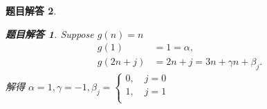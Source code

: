 \documentclass[mode=geye]{elegantnote}
\newtheorem{answer}{题目解答}
\begin{document}
\begin{answer}
\begin{answer}
	Suppose $ g(n) = n $
	\begin{equation*}
		\begin{aligned}
			g(1) 	&= 1 = \alpha,\\
			g(2n+j)	&= 2n+j = 3n+\gamma n+\beta_j.
		\end{aligned}
	\end{equation*}
解得 $   \alpha = 1, \gamma = -1, \beta_j = \left\{ \begin{array}{l}
	0,\quad j=0\\
	1,\quad j=1\\
\end{array}\right.$

\end{answer}

\end{answer}
\end{document}
